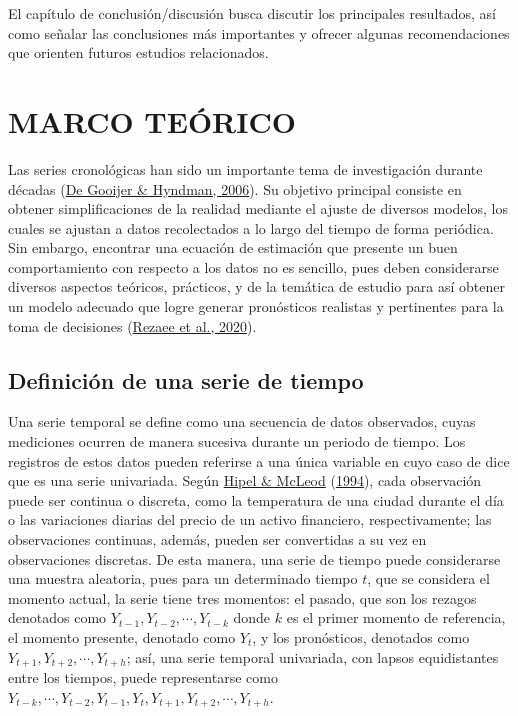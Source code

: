 \documentclass[
]{article}
\begin{document}
El capítulo de conclusión/discusión busca discutir los principales
resultados, así como señalar las conclusiones más importantes y ofrecer
algunas recomendaciones que orienten futuros estudios relacionados.

\newpage

\section{MARCO TEÓRICO}

Las series cronológicas han sido un importante tema de investigación
durante décadas (\protect\hyperlink{ref-tsa_decades}{De Gooijer \&
Hyndman, 2006}). Su objetivo principal consiste en obtener
simplificaciones de la realidad mediante el ajuste de diversos modelos,
los cuales se ajustan a datos recolectados a lo largo del tiempo de
forma periódica. Sin embargo, encontrar una ecuación de estimación que
presente un buen comportamiento con respecto a los datos no es sencillo,
pues deben considerarse diversos aspectos teóricos, prácticos, y de la
temática de estudio para así obtener un modelo adecuado que logre
generar pronósticos realistas y pertinentes para la toma de decisiones
(\protect\hyperlink{ref-tsa_decision_making}{Rezaee et al., 2020}).

\subsection{Definición de una serie de tiempo}

Una serie temporal se define como una secuencia de datos observados,
cuyas mediciones ocurren de manera sucesiva durante un periodo de
tiempo. Los registros de estos datos pueden referirse a una única
variable en cuyo caso de dice que es una serie univariada. Según
\protect\hyperlink{ref-Hipel}{Hipel \& McLeod}
(\protect\hyperlink{ref-Hipel}{1994}), cada observación puede ser
continua o discreta, como la temperatura de una ciudad durante el día o
las variaciones diarias del precio de un activo financiero,
respectivamente; las observaciones continuas, además, pueden ser
convertidas a su vez en observaciones discretas. De esta manera, una
serie de tiempo puede considerarse una muestra aleatoria, pues para un
determinado tiempo \(t\), que se considera el momento actual, la serie
tiene tres momentos: el pasado, que son los rezagos denotados como
\(Y_{t-1}, Y_{t-2}, \cdots, Y_{t-k}\) donde \(k\) es el primer momento
de referencia, el momento presente, denotado como \(Y_t\), y los
pronósticos, denotados como \(Y_{t+1}, Y_{t+2}, \cdots, Y_{t+h}\); así,
una serie temporal univariada, con lapsos equidistantes entre los
tiempos, puede representarse como
\(Y_{t-k}, \cdots, Y_{t-2}, Y_{t-1}, Y_t, Y_{t+1}, Y_{t+2}, \cdots, Y_{t+h}\).
\end{document}
